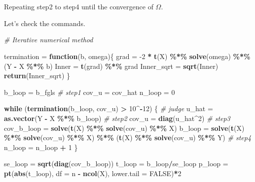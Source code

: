 \documentclass[
  12pt,
]{article}
\newenvironment{Shaded}{\begin{snugshade}}{\end{snugshade}}
\newcommand{\CommentTok}[1]{\textcolor[rgb]{0.56,0.35,0.01}{\textit{#1}}}
\newcommand{\ControlFlowTok}[1]{\textcolor[rgb]{0.13,0.29,0.53}{\textbf{#1}}}
\newcommand{\DataTypeTok}[1]{\textcolor[rgb]{0.13,0.29,0.53}{#1}}
\newcommand{\DecValTok}[1]{\textcolor[rgb]{0.00,0.00,0.81}{#1}}
\newcommand{\KeywordTok}[1]{\textcolor[rgb]{0.13,0.29,0.53}{\textbf{#1}}}
\newcommand{\NormalTok}[1]{#1}
\newcommand{\OperatorTok}[1]{\textcolor[rgb]{0.81,0.36,0.00}{\textbf{#1}}}
\newcommand{\OtherTok}[1]{\textcolor[rgb]{0.56,0.35,0.01}{#1}}
\newcommand{\StringTok}[1]{\textcolor[rgb]{0.31,0.60,0.02}{#1}}
\begin{document}
Repeating step2 to step4 until the convergence of \(\hat{\Omega}\).

Let's check the commands.

\begin{Shaded}
\begin{Highlighting}[]
\CommentTok{\# Iterative numerical method}

\NormalTok{termination =}\StringTok{ }\ControlFlowTok{function}\NormalTok{(b, omega)\{}
\NormalTok{    grad =}\StringTok{ }\DecValTok{{-}2} \OperatorTok{*}\StringTok{ }\KeywordTok{t}\NormalTok{(X) }\OperatorTok{\%*\%}\StringTok{ }\KeywordTok{solve}\NormalTok{(omega) }\OperatorTok{\%*\%}\StringTok{ }\NormalTok{(Y }\OperatorTok{{-}}\StringTok{ }\NormalTok{X }\OperatorTok{\%*\%}\StringTok{ }\NormalTok{b)}
\NormalTok{    Inner =}\StringTok{ }\KeywordTok{t}\NormalTok{(grad) }\OperatorTok{\%*\%}\StringTok{ }\NormalTok{grad}
\NormalTok{    Inner\_sqrt =}\StringTok{ }\KeywordTok{sqrt}\NormalTok{(Inner)}
    \KeywordTok{return}\NormalTok{(Inner\_sqrt)}
\NormalTok{\}}

\NormalTok{b\_loop =}\StringTok{ }\NormalTok{b\_fgls }\CommentTok{\# step1}
\NormalTok{cov\_u =}\StringTok{ }\NormalTok{cov\_hat}
\NormalTok{n\_loop =}\StringTok{ }\DecValTok{0}

\ControlFlowTok{while}\NormalTok{ (}\KeywordTok{termination}\NormalTok{(b\_loop, cov\_u) }\OperatorTok{\textgreater{}}\StringTok{ }\DecValTok{10}\OperatorTok{\^{}{-}}\DecValTok{12}\NormalTok{) \{ }\CommentTok{\# judge}
\NormalTok{    u\_hat =}\StringTok{ }\KeywordTok{as.vector}\NormalTok{(Y }\OperatorTok{{-}}\StringTok{ }\NormalTok{X }\OperatorTok{\%*\%}\StringTok{ }\NormalTok{b\_loop) }\CommentTok{\# step2}
\NormalTok{    cov\_u =}\StringTok{ }\KeywordTok{diag}\NormalTok{(u\_hat}\OperatorTok{\^{}}\DecValTok{2}\NormalTok{)   }\CommentTok{\# step3}
\NormalTok{    cov\_b\_loop =}\StringTok{ }\KeywordTok{solve}\NormalTok{(}\KeywordTok{t}\NormalTok{(X) }\OperatorTok{\%*\%}\StringTok{ }\KeywordTok{solve}\NormalTok{(cov\_u) }\OperatorTok{\%*\%}\StringTok{ }\NormalTok{X)}
\NormalTok{    b\_loop =}\StringTok{  }\KeywordTok{solve}\NormalTok{(}\KeywordTok{t}\NormalTok{(X) }\OperatorTok{\%*\%}\StringTok{ }\KeywordTok{solve}\NormalTok{(cov\_u) }\OperatorTok{\%*\%}\StringTok{ }\NormalTok{X) }\OperatorTok{\%*\%}\StringTok{ }\NormalTok{(}\KeywordTok{t}\NormalTok{(X) }\OperatorTok{\%*\%}\StringTok{ }\KeywordTok{solve}\NormalTok{(cov\_u) }\OperatorTok{\%*\%}\StringTok{ }\NormalTok{Y) }\CommentTok{\# step4}
\NormalTok{    n\_loop =}\StringTok{ }\NormalTok{n\_loop }\OperatorTok{+}\StringTok{ }\DecValTok{1}
\NormalTok{\}}


\NormalTok{se\_loop =}\StringTok{ }\KeywordTok{sqrt}\NormalTok{(}\KeywordTok{diag}\NormalTok{(cov\_b\_loop))}
\NormalTok{t\_loop =}\StringTok{ }\NormalTok{b\_loop}\OperatorTok{/}\NormalTok{se\_loop}
\NormalTok{p\_loop =}\StringTok{ }\KeywordTok{pt}\NormalTok{(}\KeywordTok{abs}\NormalTok{(t\_loop), }\DataTypeTok{df =}\NormalTok{ n }\OperatorTok{{-}}\StringTok{ }\KeywordTok{ncol}\NormalTok{(X), }\DataTypeTok{lower.tail =} \OtherTok{FALSE}\NormalTok{)}\OperatorTok{*}\DecValTok{2}
\end{Highlighting}
\end{Shaded}
\end{document}
